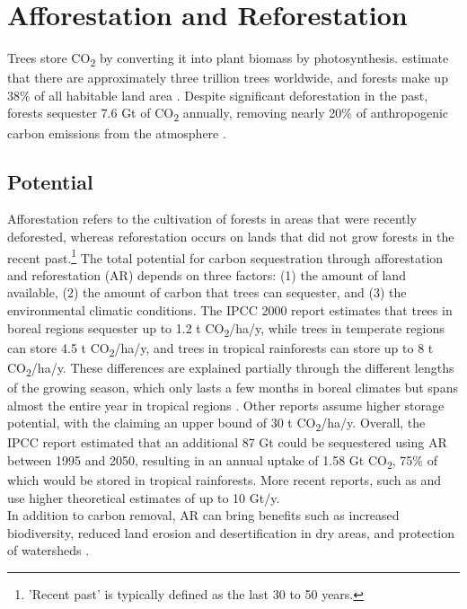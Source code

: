 \section{Afforestation and Reforestation}
Trees store CO\textsubscript{2} by converting it into plant biomass by photosynthesis. \textcite{Crowther2015MappingScale} estimate that there are approximately three trillion trees worldwide, and forests make up 38\% of all habitable land area \parencite{RitchieHowForested}. Despite significant deforestation in the past, forests sequester 7.6 Gt of CO\textsubscript{2} annually, removing nearly 20\% of anthropogenic carbon emissions from the atmosphere \parencite{Harris2021GlobalFluxes}.
\subsection*{Potential}
Afforestation refers to the cultivation of forests in areas that were recently deforested, whereas reforestation occurs on lands that did not grow forests in the recent past.\footnote{'Recent past' is typically defined as the last 30 to 50 years.} The total potential for carbon sequestration through afforestation and reforestation (AR) depends on three factors: (1) the amount of land available, (2) the amount of carbon that trees can sequester, and (3) the environmental climatic conditions.
The IPCC 2000 report estimates that trees in boreal regions sequester up to 1.2 t CO\textsubscript{2}/ha/y, while trees in temperate regions can store 4.5 t CO\textsubscript{2}/ha/y, and trees in tropical rainforests can store up to 8 t CO\textsubscript{2}/ha/y. These differences are explained partially through the different lengths of the growing season, which only lasts a few months in boreal climates but spans almost the entire year in tropical regions \parencite[172-173]{Watson2000LandForestry}. Other reports assume higher storage potential, with the \textcite{NAS2018NegativeAgenda} claiming an upper bound of 30 t CO\textsubscript{2}/ha/y. Overall, the IPCC report estimated that an additional 87 Gt could be sequestered using AR between 1995 and 2050, resulting in an annual uptake of 1.58 Gt CO\textsubscript{2}, 75\% of which would be stored in tropical rainforests. More recent reports, such as \textcite{Fuss2018NegativeEffects} and \textcite{Griscom2017NaturalSolutions} use higher theoretical estimates of up to 10 Gt/y.\\
In addition to carbon removal, AR can bring benefits such as increased biodiversity, reduced land erosion and desertification in dry areas, and protection of watersheds \parencite[177]{Watson2000LandForestry}.
